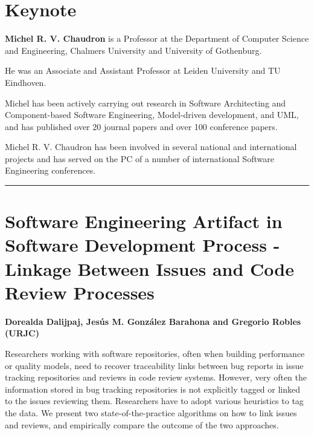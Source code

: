 \documentclass[11pt,pressrelease]{newlfm} %
\begin{document}
\begin{newlfm}



\section{Keynote}

{\bf Michel R. V. Chaudron} is a Professor at the Department of Computer Science and Engineering, Chalmers University and University of Gothenburg.

He was an Associate and Assistant Professor at Leiden University and TU Eindhoven.

Michel has been actively carrying out research in Software Architecting and Component-based Software Engineering, Model-driven development, and UML, and has published over 20 journal papers and over 100 conference papers.

Michel R. V. Chaudron has been involved in several national and international projects and has served on the PC of a number of international Software Engineering conferences.

\rule{\textwidth}{1pt} \par \noindent
\section{Software Engineering Artifact in Software Development Process - Linkage Between Issues and Code Review Processes}

{\bf Dorealda Dalijpaj, Jes\'us M. Gonz\'alez Barahona and Gregorio Robles (URJC)}

Researchers working with software repositories, often when building performance
or quality models, need to recover traceability links between bug reports in issue tracking
repositories and reviews in code review systems. However, very often the information stored
in bug tracking repositories is not explicitly tagged or linked to the issues reviewing them.
Researchers have to adopt various heuristics to tag the data. We present two state-of-the-practice
algorithms on how to link issues and reviews, and empirically compare the outcome of the two approaches.


\end{newlfm}
\end{document}
